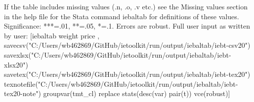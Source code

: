 If the table includes missing values (.n, .o, .v etc.) see the Missing values section in the help file for the Stata command iebaltab for definitions of these values. Significance: ***=.01, **=.05, *=.1. Errors are robust. Full user input as written by user: [iebaltab weight price , savecsv("C:/Users/wb462869/GitHub/ietoolkit/run/output/iebaltab/iebt-csv20") savexlsx("C:/Users/wb462869/GitHub/ietoolkit/run/output/iebaltab/iebt-xlsx20") savetex("C:/Users/wb462869/GitHub/ietoolkit/run/output/iebaltab/iebt-tex20") texnotefile("C:/Users/wb462869/GitHub/ietoolkit/run/output/iebaltab/iebt-tex20-note") groupvar(tmt\_cl) replace stats(desc(var) pair(t)) vce(robust)] 
